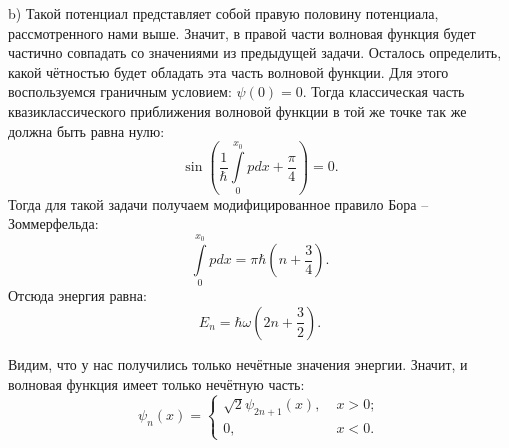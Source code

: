 b) Такой потенциал представляет собой правую половину потенциала,
рассмотренного нами выше. Значит, в правой части волновая функция будет
частично совпадать со значениями из предыдущей задачи. Осталось определить,
какой чётностью будет обладать эта часть волновой функции. Для этого
воспользуемся граничным условием: $\psi(0) = 0$. Тогда классическая часть
квазиклассического приближения волновой функции в той же точке так же должна
быть равна нулю:
\[
  \sin\left(\frac{1}{\hbar}\int\limits_0^{x_0} p dx + \frac{\pi}{4} \right) = 0.
\]
Тогда для такой задачи получаем модифицированное правило Бора -- Зоммерфельда:
\[
  \int\limits_0^{x_0} p dx = \pi\hbar\left(n +\frac{3}{4} \right).
\]
Отсюда энергия равна:
\[
  E_n = \hbar\omega(2n + \frac{3}{2}).
\]

Видим, что у нас получились только нечётные значения энергии. Значит, и
волновая функция имеет только нечётную часть:
\[
  \psi_n(x) =
  \begin{cases}
    \sqrt{2}\psi_{2n+1}(x), \; &x > 0;\\
    0, \; &x < 0.
  \end{cases}
\]
\qedsq